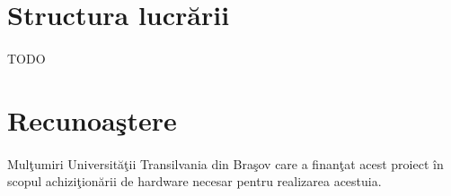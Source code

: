 \section{Structura lucr\u arii}

\paragraph{}
TODO


\section{Recunoa\c stere}

\paragraph{}
Mul\c tumiri Universit\u a\c tii Transilvania din Bra\c sov care a finan\c tat acest proiect \^ in scopul achizi\c tion\u arii de hardware necesar pentru realizarea acestuia.